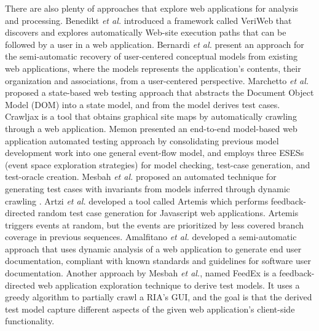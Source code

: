 \documentclass[10pt, conference, compsocconf]{IEEEtran}
\begin{document}
There are also plenty of approaches that explore web applications for analysis and processing. Benedikt \textit{et al.} introduced a framework called VeriWeb \cite{benedikt2002veriWeb} that discovers and explores automatically Web-site execution paths that can be followed by a user in a web application. Bernardi \textit{et al.} \cite{bernardi2008reverse} present an approach for the semi-automatic recovery of user-centered conceptual models from existing web applications, where the models represents the application's contents, their organization and associations, from a user-centered perspective. Marchetto \textit{et al.} proposed a state-based web testing approach \cite{marchetto2008state} that abstracts the Document Object Model (DOM) into a state model, and from the model derives test cases. Crawljax \cite{roest2010automated} is a tool that obtains graphical site maps by automatically crawling through a web application. Memon presented an end-to-end model-based web application automated testing approach \cite{memon2007event} by consolidating previous model development work into one general event-flow model, and employs three ESESs (event space exploration strategies) for model checking, test-case generation, and test-oracle creation. Mesbah \textit{et al.} proposed an automated technique for generating test cases with invariants from models inferred through dynamic crawling \cite{mesbah2012invariant}. Artzi \textit{et al.} developed a tool called Artemis \cite{artzi2011framework} which performs feedback-directed random test case generation for Javascript web applications. Artemis triggers events at random, but the events are prioritized by less covered branch coverage in previous sequences. Amalfitano \textit{et al.} developed a semi-automatic approach \cite{amalfitano2011using} that uses dynamic analysis of a web application to generate end user documentation, compliant with known standards and guidelines for software user documentation. Another approach by Mesbah \textit{et al.}, named FeedEx \cite{fard2013feedback} is a feedback-directed web application exploration technique to derive test models. It uses a greedy algorithm to partially crawl a RIA's GUI, and the goal is that the derived test model capture different aspects of the given web application's client-side functionality.  %
\end{document}
